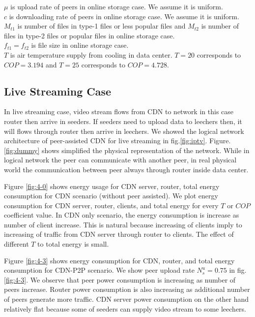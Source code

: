 \documentclass[conference]{IEEEtran}
\begin{document}
$\mu$ is upload rate of peers in online storage case. We assume it is uniform. \\
$c$ is downloading rate of peers in online storage case. We assume it is uniform.
$M_{t1}$ is number of files in type-1 files or less popular files and $M_{t2}$ is number of files in type-2 files or popular files in online storage case.\\
$f_{t1} = f_{t2}$ is file size in online storage case.\\
$T$ is air temperature supply from cooling in data center.  $T=20$ corresponds to $COP=3.194$ and $T=25$ corresponds to $COP=4.728$.\\





\subsection{Live Streaming Case}
In live streaming case, video stream flows from CDN to network in this case router then arrive in seeders. 
If seeders need to upload data to leechers then, it will flows through router then arrive in leechers. 
We showed the logical network architecture of peer-assisted CDN for live streaming in fig.\ref{fig:iptv}.
Figure.\ref{fig:dummy} shows simplified the physical representation of the network.  
While in logical network the peer can communicate with another peer, in real physical world the communication between peer always through router inside data center.

Figure \ref{fig:4-0} shows energy usage for CDN server, router, total energy consumption for CDN scenario (without peer assisted).
We plot energy consumption for CDN server, router, clients, and total energy for every $T$ or $COP$ coefficient value.
In CDN only scenario, the energy consumption is increase as number of client increase.  
This is natural because increasing of clients imply to increasing of traffic from CDN server through router to clients.
The effect of different $T$ to total energy is small.  

Figure \ref{fig:4-3} shows energy consumption for CDN, router, and total energy consumption for CDN-P2P scenario.
We show peer upload rate $N_{s}^{u}=0.75$ in fig.\ref{fig:4-3}.
We observe that peer power consumption is increasing as number of peers increase.  
Router power consumption is also increasing as additional number of peers generate more traffic. 
CDN server power consumption on the other hand relatively flat because some of seeders can supply video stream to some leechers.
\end{document}
